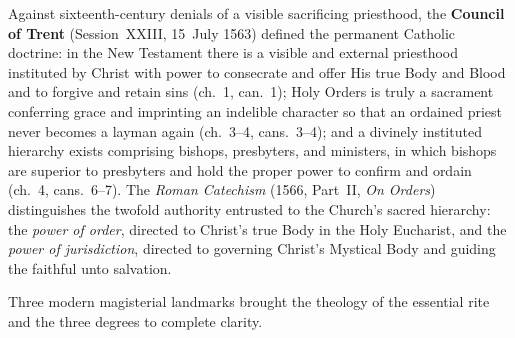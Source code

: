 Against sixteenth-century denials of a visible sacrificing priesthood, the \textbf{Council of Trent} (Session~XXIII, 15~July 1563) defined the permanent Catholic doctrine: in the New Testament there is a visible and external priesthood instituted by Christ with power to consecrate and offer His true Body and Blood and to forgive and retain sins (ch.~1, can.~1); Holy Orders is truly a sacrament conferring grace and imprinting an indelible character so that an ordained priest never becomes a layman again (ch.~3--4, cans.~3--4); and a divinely instituted hierarchy exists comprising bishops, presbyters, and ministers, in which bishops are superior to presbyters and hold the proper power to confirm and ordain (ch.~4, cans.~6--7). The \emph{Roman Catechism} (1566, Part~II, \emph{On Orders}) distinguishes the twofold authority entrusted to the Church's sacred hierarchy: the \emph{power of order}, directed to Christ's true Body in the Holy Eucharist, and the \emph{power of jurisdiction}, directed to governing Christ's Mystical Body and guiding the faithful unto salvation.

Three modern magisterial landmarks brought the theology of the essential rite and the three degrees to complete clarity.

